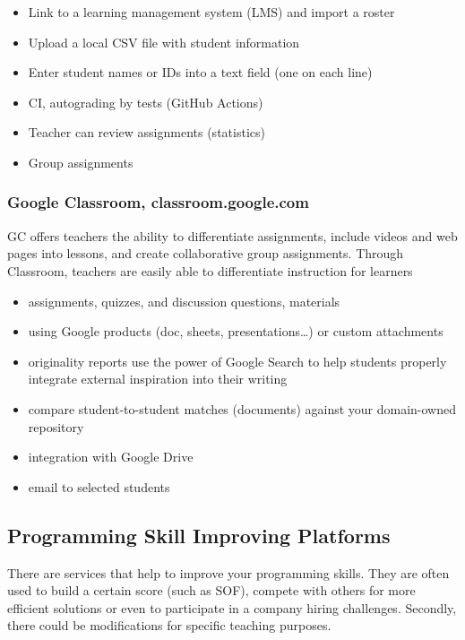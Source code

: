 \begin{itemize}
\item
  {Link to a learning management system (LMS) and import a roster}
\item
  {Upload a local CSV file with student information}
\item
  {Enter student names or IDs into a text field (one on each line)}
\end{itemize}

\begin{itemize}
\item
  {CI, autograding by tests (GitHub Actions)}
\item
  {Teacher can review assignments (statistics)}
\item
  {Group assignments}
\end{itemize}

\subsubsection{Google Classroom, classroom.google.com}

{GC offers teachers the ability to differentiate assignments, include videos and web pages into lessons, and create collaborative group assignments. Through Classroom, teachers are easily able to differentiate instruction for learners}

\begin{itemize}
\item
  {assignments, quizzes, and discussion questions, materials}
\item
  {using Google products (doc, sheets, presentations\ldots{}) or custom attachments}
\item
  {originality reports use the power of Google Search to help students properly integrate external inspiration into their writing}
\item
  {compare student-to-student matches (documents) against your domain-owned repository}
\item
  {integration with Google Drive}
\item
  {email to selected students}
\end{itemize}

\subsection{Programming Skill Improving Platforms} \label{ssec:psip}

{There are services that help to improve your programming skills. They are often used to build a certain score (such as SOF), compete with others for more efficient solutions or even to participate in a company hiring challenges. Secondly, there could be modifications for specific teaching purposes.}

